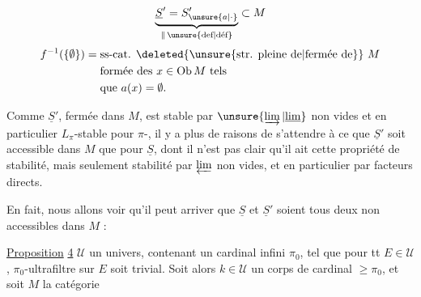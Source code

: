 
\[
\underbrace{\underline S'=S'_{\unsure{a|\cdot}}}_{\Vert\,\text{\unsure{def|déf}}}\subset M
\]
\[
\begin{aligned}
 f^{-1}(\{\emptyset\})={}&\text{ss-cat. \deleted{\unsure{str. pleine de|fermée de}} }M\\
 &\text{formée des }x\in\mathrm{Ob}\,M\text{ tels}\\
 &\text{que } a(x)=\emptyset .
\end{aligned}
\]

Comme $\underline S'$,  fermée dans $M$, est
stable par $\unsure{\varinjlim|\underline{\lim}}$ non vides et en
particulier $L_{\pi}$-stable pour $\pi$-, il y a plus de raisons de
s'attendre à ce que $\underline S'$ soit accessible dans $M$ que pour
 $\underline S$, 
dont il n'est pas clair qu'il ait cette propriété de stabilité, mais
seulement stabilité par $\varprojlim$ non vides, et en particulier par
facteurs directs.

En fait, nous allons voir qu'il peut arriver que $\underline S$ et
$\underline S'$ soient tous deux non accessibles dans $M$ :

\uline{Proposition} \uline{4}  $\mathcal U$ un univers, contenant
un cardinal infini $\pi_0$, tel que pour tt $E\in\mathcal U$,
  $\pi_0$-ultrafiltre sur
$E$ soit trivial. Soit alors $k\in\mathcal U$ un corps de cardinal
$\geq\pi_0$, et soit $M$ la catégorie
